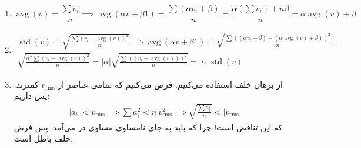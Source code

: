 \\
\begin{enumerate}[wide, labelwidth=!, labelindent=0pt]
\item
\begin{equation*}
\operatorname{avg}(v) = \frac{\sum v_i}{n} \implies
\operatorname{avg}(\alpha v + \beta 1) = \frac{\sum (\alpha v_i + \beta)}{n} = \frac{\alpha(\sum v_i) + n\beta}{n}
= \alpha \operatorname{avg}(v) + \beta
\end{equation*}
\item
\begin{gather*}
\operatorname{std}(v) = \sqrt{\frac{\sum(v_i - \operatorname{avg}(v))^2}{n}} \implies
\operatorname{avg}(\alpha v + \beta 1) = \sqrt{\frac{\sum((\alpha v_i + \beta) - (\alpha \operatorname{avg}(v) + \beta))^2}{n}} =\\
\sqrt{\frac{\alpha^2\sum(v_i - \operatorname{avg}(v))^2}{n}} = 
|\alpha|\sqrt{\frac{\sum((v_i - \operatorname{avg}(v)))^2}{n}} = |\alpha|\operatorname{std}(v)
\end{gather*}
\item از برهان خلف استفاده می‌کنیم. فرض می‌کنیم که تمامی عناصر از
$v_{\operatorname{rms}}$
کمترند. پس داریم:
\begin{gather*}
|a_i| < v_{\operatorname{rms}} \implies \sum a_i^2 < n ~ v_{\operatorname{rms}}^2 \implies
\sqrt{\frac{\sum a_i^2}{n}} < |v_{\operatorname{rms}}|
\end{gather*}
که این تناقض است! چرا که باید به جای نامساوی مساوی در می‌آمد. پس فرض خلف باطل است.
\end{enumerate}